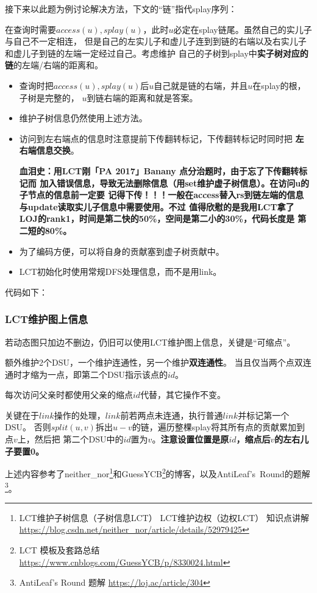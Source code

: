 接下来以此题为例讨论解决方法，下文的``链''指代splay序列：

在查询时需要$access(u),splay(u)$，此时$u$必定在splay链尾。虽然自己的实儿子与自己不一定相连，
但是自己的左实儿子和虚儿子连到到链的右端以及右实儿子和虚儿子到链的左端一定经过自己。考虑维护
自己的子树到splay中{\bfseries 实子树对应的链}的左端/右端的距离和。
\begin{itemize}
    \item 查询时把$access(u),splay(u)$后$u$自己就是链的右端，并且$u$在splay的根，子树是完整的，
    $u$到链右端的距离和就是答案。
    \item 维护子树信息仍然使用上述方法。
    \item 访问到左右端点的信息时注意提前下传翻转标记，下传翻转标记时同时把{\bfseries
    左右端信息交换}。

    {\bfseries 血泪史：用LCT刚「PA 2017」Banany 点分治题时，由于忘了下传翻转标记而
    加入错误信息，导致无法删除信息（用set维护虚子树信息）。在访问u的子节点的信息前一定要
    记得下传！！！一般在access替入rs到链左端的信息与update读取实儿子信息中需要使用。不过
    值得欣慰的是我用LCT拿了LOJ的rank1，时间是第二快的50\%，空间是第二小的30\%，代码长度是
    第二短的80\%。}
    \item 为了编码方便，可以将自身的贡献塞到虚子树贡献中。
    \item LCT初始化时使用常规DFS处理信息，而不是用link。
\end{itemize}

代码如下：


\subsubsection{LCT维护图上信息}
若动态图只加边不删边，仍旧可以使用LCT维护图上信息，关键是``可缩点''。

额外维护2个DSU，一个维护连通性，另一个维护{\bfseries 双连通性}。
当且仅当两个点双连通时才缩为一点，即第二个DSU指示该点的$id$。

每次访问父亲时都使用父亲的缩点$id$代替，其它操作不变。

关键在于$link$操作的处理，$link$前若两点未连通，执行普通$link$并标记第一个DSU。
否则$split(u,v)$拆出$u-v$的链，遍历整棵splay将其所有点的贡献累加到点$v$上，然后把
第二个DSU中的$id$置为$v$。{\bfseries 注意设置位置是原$id$，缩点后$v$的左右儿子要置0。}

上述内容参考了neither\_nor\footnote{
    LCT维护子树信息（子树信息LCT） LCT维护边权（边权LCT） 知识点讲解\\
    \url{https://blog.csdn.net/neither\_nor/article/details/52979425}
}和GuessYCB\footnote{
    LCT 模板及套路总结
    \url{https://www.cnblogs.com/GuessYCB/p/8330024.html}
}的博客，以及AntiLeaf's~Round的题解\footnote{
    AntiLeaf's Round 题解
    \url{https://loj.ac/article/304}
}。

